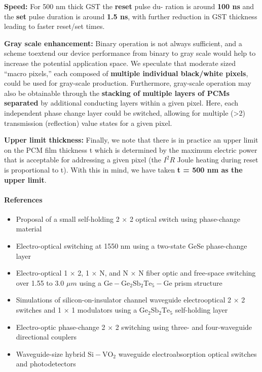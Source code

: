 \documentclass[]{article}
\providecommand{\tightlist}{%
  \setlength{\itemsep}{0pt}\setlength{\parskip}{0pt}}
\let\oldparagraph\paragraph
\renewcommand{\paragraph}[1]{\oldparagraph{#1}\mbox{}}
\begin{document}
\textbf{Speed:} For 500 nm thick GST the \textbf{reset} pulse du- ration
is around \textbf{100 ns} and the \textbf{set} pulse duration is around
\textbf{1.5 ns}, with further reduction in GST thickness leading to
faster reset/set times.

\textbf{Gray scale enhancement:} Binary operation is not always
sufficient, and a scheme toextend our device performance from binary to
gray scale would help to increase the potential application space. We
speculate that moderate sized ``macro pixels,'' each composed of
\textbf{multiple individual black/white pixels}, could be used for
gray-scale production. Furthermore, gray-scale operation may also be
obtainable through the \textbf{stacking of multiple layers of PCMs
separated} by additional conducting layers within a given pixel. Here,
each independent phase change layer could be switched, allowing for
multiple (\textgreater{}2) transmission (reflection) value states for a
given pixel.

\textbf{Upper limit thickness:} Finally, we note that there is in
practice an upper limit on the PCM film thickness t which is determined
by the maximum electric power that is acceptable for addressing a given
pixel (the \(I^2 R\) Joule heating during reset is proportional to t).
With this in mind, we have taken \textbf{t = 500 nm as the upper limit}.

\paragraph{References}\label{references}

\begin{itemize}
\tightlist
\item
  Proposal of a small self-holding 2 × 2 optical switch using
  phase-change material
\item
  Electro-optical switching at 1550 nm using a two-state GeSe
  phase-change layer
\item
  Electro-optical 1 × 2, 1 × N, and N × N fiber optic and free-space
  switching over 1.55 to 3.0 \(\mu m\) using a
  \(\mathrm{Ge-Ge_2 Sb_2 Te_5 -Ge}\) prism structure
\item
  Simulations of silicon-on-insulator channel waveguide electrooptical 2
  × 2 switches and 1 × 1 modulators using a \(\mathrm{Ge_2 Sb_2 Te_5}\)
  self-holding layer
\item
  Electro-optic phase-change 2 × 2 switching using three- and
  four-waveguide directional couplers
\item
  Waveguide-size hybrid \(\mathrm{Si-VO_2}\) waveguide electroabsorption
  optical switches and photodetectors
\end{itemize}
\end{document}
